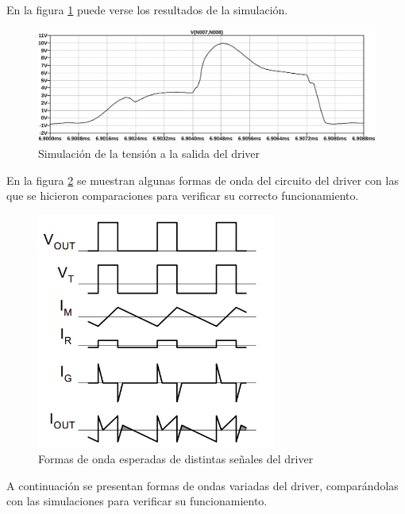 En la figura \ref{fig:sim:driver_vout_connected} puede verse los resultados de la simulación.

\begin{figure}[H]
    \centering
    \includegraphics[width=\textwidth]{images/sim/15.pdf}
    \caption{Simulación de la tensión a la salida del driver}
    \label{fig:sim:driver_vout_connected}
\end{figure}

En la figura \ref{fig:driver_expected_waveforms} se muestran algunas formas de onda del circuito del driver con las que se hicieron comparaciones para verificar su correcto funcionamiento.

\begin{figure}[H]
    \centering
    \includegraphics[width=0.7\textwidth]{images/driver_expected_waveforms.png}
    \caption{Formas de onda esperadas de distintas señales del driver \cite{gatedrivers}}
    \label{fig:driver_expected_waveforms}
\end{figure}

A continuación se presentan formas de ondas variadas del driver, comparándolas con las simulaciones para verificar su funcionamiento.

